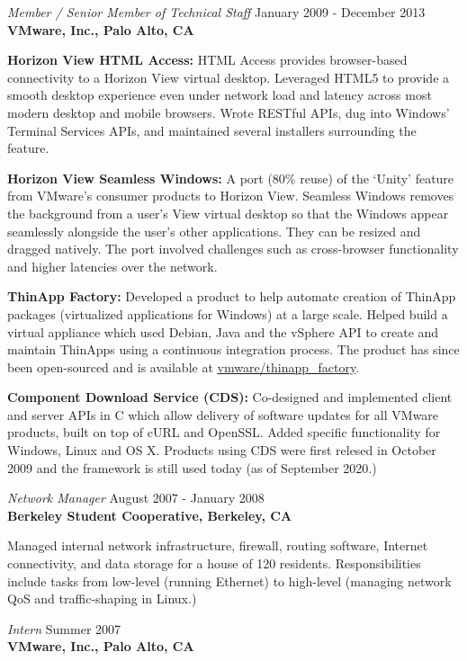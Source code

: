 \documentclass[overlapped,line,margin]{res}
\begin{document}
\begin{resume}
\textit{Member / Senior Member of Technical Staff} \hfill January 2009 - December 2013 \\
\textbf{VMware, Inc., Palo Alto, CA}

  \textbf{Horizon View HTML Access:} HTML Access provides browser-based
  connectivity to a Horizon View virtual desktop. Leveraged HTML5 to
  provide a smooth desktop experience even under network load and
  latency across most modern desktop and mobile browsers. Wrote RESTful
  APIs, dug into Windows' Terminal Services APIs, and maintained several
  installers surrounding the feature.

  \textbf{Horizon View Seamless Windows:} A port (80\% reuse) of the
  `Unity' feature from VMware's consumer products to Horizon View.
  Seamless Windows removes the background from a user's View virtual
  desktop so that the Windows appear seamlessly alongside the user's
  other applications. They can be resized and dragged natively. The
  port involved challenges such as cross-browser functionality and
  higher latencies over the network.

  \textbf{ThinApp Factory:} Developed a product to help automate
  creation of ThinApp packages (virtualized applications for Windows) at
  a large scale. Helped build a virtual appliance which used Debian,
  Java and the vSphere API to create and maintain ThinApps using a
  continuous integration process. The product has since been
  open-sourced and is available at
  \href{https://github.com/vmware/thinapp\_factory}{vmware/thinapp\_factory}.

  \textbf{Component Download Service (CDS):} Co-designed and implemented
  client and server APIs in C which allow delivery of software updates for
  all VMware products, built on top of cURL and OpenSSL. Added specific
  functionality for Windows, Linux and OS X. Products using CDS were
  first relesed in October 2009 and the framework is still used today
  (as of September 2020.)

\textit{Network Manager} \hfill August 2007 - January 2008 \\
\textbf{Berkeley Student Cooperative, Berkeley, CA}

  Managed internal network infrastructure, firewall, routing
  software, Internet connectivity, and data storage for a house of 120 residents.
  Responsibilities include tasks from low-level (running Ethernet)
  to high-level (managing network QoS and traffic-shaping in Linux.)

\textit{Intern} \hfill Summer 2007 \\
\textbf{VMware, Inc., Palo Alto, CA}


\end{resume}
\end{document}
